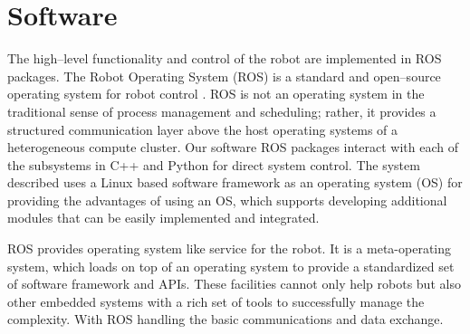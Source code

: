 \section{Software}
The high–level functionality and control of the robot are implemented in ROS packages. The Robot Operating System (ROS) is a standard and open–source operating system for robot control \cite{9}. ROS is not an operating system in the traditional sense of process management and scheduling; rather, it provides a structured communication layer above the host operating systems of a heterogeneous compute cluster. Our software ROS packages interact with each of the subsystems in C++ and Python for direct system control. The system described uses a Linux based software framework as an operating system (OS) for providing the advantages of using an OS, which supports developing additional modules that can be easily implemented and integrated. 

ROS provides operating system like service for the robot. It is a meta-operating system, which loads on top of an operating system to provide a standardized set of software framework and APIs. These facilities cannot only help robots but also other embedded systems with a rich set of tools to successfully manage the complexity. With ROS handling the basic communications and data exchange.